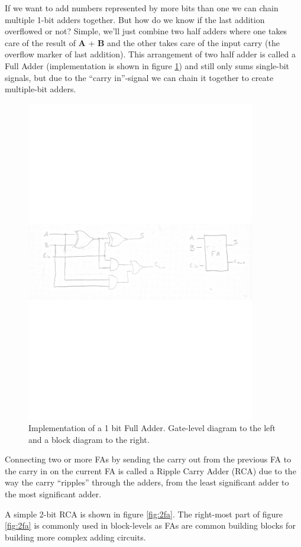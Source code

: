 \documentclass{article}
\begin{document}
If we want to add numbers represented by more bits than one we can
chain multiple 1-bit adders together. But how do we know if the last
addition overflowed or not? Simple, we'll just combine two half adders
where one takes care of the result of {\bf A} + {\bf B} and the other
takes care of the input carry (the overflow marker of last addition).
This arrangement of two half adder is called a Full Adder
(implementation is shown in figure \ref{fig:fa}) and still only sums
single-bit signals, but due to the ``carry in''-signal we can chain it
together to create multiple-bit adders.

\begin{figure}[ht]
  \centering
  \includegraphics[width=10cm]{images/FA.pdf}
  \caption{Implementation of a 1 bit Full Adder. Gate-level diagram to the left and a block diagram to the right.}
  \label{fig:fa}
\end{figure}

Connecting two or more FAs by sending the carry out from the previous
FA to the carry in on the current FA is called a Ripple Carry Adder
(RCA) due to the way the carry ``ripples'' through the adders, from
the least significant adder to the most significant adder.

A simple 2-bit RCA is shown in figure \ref{fig:2fa}. The right-most
part of figure \ref{fig:2fa} is commonly used in block-levels as FAs
are common building blocks for building more complex adding circuits.
\end{document}
